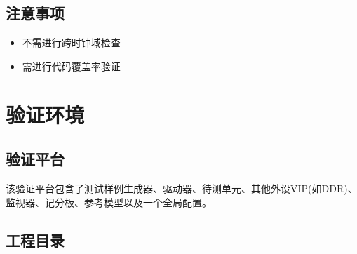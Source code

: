 \documentclass[12pt, a4paper, oneside]{ctexbook}
\begin{document}
		\section{注意事项}
		\begin{itemize}
			\item 不需进行跨时钟域检查
			\item 需进行代码覆盖率验证	
		\end{itemize}		
		
		
	\chapter{验证环境}
		\section{验证平台}
		该验证平台包含了测试样例生成器、驱动器、待测单元、其他外设VIP(如DDR)、监视器、记分板、参考模型以及一个全局配置。
		
		
		
		
		\section{工程目录}
	
\end{document}

